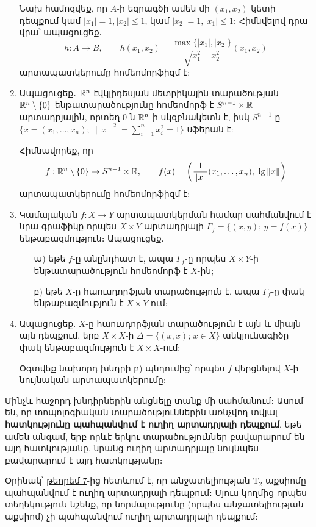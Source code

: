 \begin{enumerate}[label=\thesection.\arabic*.]
\begin{hint}
Նախ համոզվեք, որ $A$-ի եզրագծի ամեն մի $(x_1, x_2)$ կետի դեպքում կամ $|x_1|=1, |x_2| \le 1$, կամ $|x_2|=1, |x_1| \le 1$։ Հիմնվելով դրա վրա՝ ապացուցեք․
\[
h: A \to B, \qquad h(x_1, x_2) = \frac{\max\{|x_1|, |x_2|\}}{\sqrt{x_1^2+x_2^2}}(x_1, x_2)
\] 
արտապատկերումը հոմեոմորֆիզմ է:
\end{hint}

\item Ապացուցեք․ $\mathbb{R}^n$ էվկլիդեսյան մետրիկային տարածության $\mathbb{R}^n \setminus \{0\}$ ենթա\-տա\-րածությունը հոմեոմորֆ է $S^{n-1} \times \mathbb{R}$ արտադրյալին, որտեղ $0$-ն $\mathbb{R}^n$-ի սկզբնա\-կետն է, իսկ $S^{n-1}$-ը $\big\{x=(x_1, \dots, x_n);\ \|x\|^2 = \sum\limits_{i=1}^n x_i^2=1\big\}$ սֆերան է:

\begin{hint}
Հիմնավորեք, որ 
\[
f: \mathbb{R}^n \setminus \{0\} \to S^{n-1} \times \mathbb{R}, \qquad f(x)=\left(\frac{1}{\|x\|}(x_1, \dots, x_n),\ \lg \|x\|\right)\]
արտապատկերումը հոմեոմորֆիզմ է:
\end{hint}

\item Կամայական $f: X \to Y$ արտապատկերման համար սահմանվում է նրա գրա\-ֆիկը որպես $X \times Y$ արտադրյալի $\Gamma_f = \{(x,y);\, y=f(x)\}$ ենթաբազ\-մու\-թյուն։ Ապացուցեք․
\begin{enumerate}
    \item[ա)] եթե $f$-ը անընդհատ է, ապա $\Gamma_f$-ը որպես $X \times Y$-ի ենթատարածություն հոմեոմորֆ է $X$-ին;
    \item[բ)] եթե $X$-ը հաուսդորֆյան տարածություն է, ապա $\Gamma_f$-ը փակ ենթաբազմու\-թյուն է $X \times Y$-ում:
\end{enumerate}

\item Ապացուցեք. $X$-ը հաուսդորֆյան տարածություն է այն և միայն այն դեպքում, երբ $X \times X$-ի $\Delta = \{(x,x);\, x \in X\}$ անկյունագիծը փակ ենթաբազմություն է $X \times X$-ում:

\begin{hint}
Օգտվեք նախորդ խնդրի բ) պնդումից՝ որպես $f$ վերցնելով $X$-ի նույնական արտապատկերումը:
\end{hint}

\end{enumerate}

\par Մինչև հաջորդ խնդիրներին անցնելը տանք մի սահմանում։ Ասում են, որ տո\-պո\-լոգիական տարածություններին առնչվող տվյալ \textbf{հատկությունը պահպանվում է ուղիղ արտադրյալի դեպքում}, եթե ամեն անգամ, երբ որևէ երկու տարածություն\-ներ բավարարում են այդ հատկությանը, նրանց ուղիղ արտադրյալը նույնպես բա\-վա\-րարում է այդ հատկությանը։
\par Օրինակ՝ \hyperref[ch13thm7]{թեորեմ 7}-ից հետևում է, որ անջատելիության $\textrm{T}_2$ աքսիոմը պահպան\-վում է ուղիղ արտադրյալի դեպքում։ Մյուս կողմից որպես տեղեկություն նշենք, որ նոր\-մա\-լու\-թյունը (որպես անջատելիության աքսիոմ) չի պահպանվում ուղիղ արտա\-դրյալի դեպքում:

